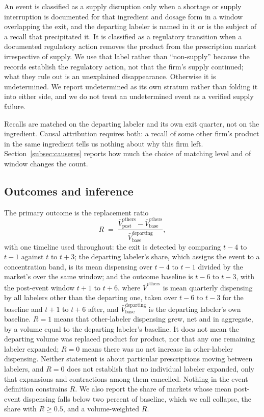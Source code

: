 \documentclass[pdflatex,sn-vancouver-num,Numbered]{sn-jnl}
\begin{document}
An event is classified as a supply disruption only when a shortage or supply interruption is
documented for that ingredient and dosage form in a window overlapping the exit, and the
departing labeler is named in it or is the subject of a recall that precipitated it. It is
classified as a regulatory transition when a documented regulatory action removes the product
from the prescription market irrespective of supply. We use that label rather than
``non-supply'' because the records establish the regulatory action, not that the firm's supply
continued; what they rule out is an unexplained disappearance. Otherwise it is undetermined. We report undetermined as its own
stratum rather than folding it into either side, and we do not treat an undetermined event as a
verified supply failure.

Recalls are matched on the departing labeler and its own exit quarter, not on the ingredient.
Causal attribution requires both: a recall of some other firm's product in the same ingredient
tells us nothing about why this firm left. Section~\ref{subsec:causeres} reports how much the
choice of matching level and of window changes the count.

\subsection{Outcomes and inference}\label{subsec:spec}

The primary outcome is the replacement ratio
\[
R \;=\; \frac{\bar{V}^{\text{others}}_{\text{post}}-\bar{V}^{\text{others}}_{\text{base}}}
{\bar{V}^{\text{departing}}_{\text{base}}},
\]
with one timeline used throughout: the exit is detected by comparing $t-4$ to $t-1$ against $t$
to $t+3$; the departing labeler's share, which assigns the event to a concentration band, is its
mean dispensing over $t-4$ to $t-1$ divided by the market's over the same window; and the
outcome baseline is $t-6$ to $t-3$, with the post-event window $t+1$ to $t+6$.
where $\bar{V}^{\text{others}}$ is mean quarterly dispensing by all labelers other than the
departing one, taken over $t-6$ to $t-3$ for the baseline and $t+1$ to $t+6$ after, and
$\bar{V}^{\text{departing}}_{\text{base}}$ is the departing labeler's own baseline. $R=1$ means
that other-labeler dispensing grew, net and in aggregate, by a volume equal to the departing
labeler's baseline. It does not mean the departing volume was replaced product for product, nor
that any one remaining labeler expanded; $R=0$ means
there was no net increase in other-labeler dispensing. Neither statement is about particular
prescriptions moving between labelers, and $R=0$ does not establish that no individual labeler
expanded, only that expansions and contractions among them cancelled. Nothing in the event definition constrains $R$. We also report the share of markets whose
mean post-event dispensing falls below two percent of baseline, which we call collapse, the
share with $R \geq 0.5$, and a volume-weighted $R$.
\end{document}
